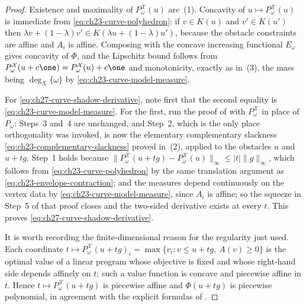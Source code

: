 \begin{proof}
Existence and maximality of \(P^{\mathcal X}_\omega(u)\) are
\,(1).  Concavity of
\(u\mapsto P^{\mathcal X}_\omega(u)\) is immediate from
\eqref{eq:ch23-curve-polyhedron}: if \(v\in K(u)\) and \(v'\in K(u')\) then
\(\lambda v+(1-\lambda)v'\in K(\lambda u+(1-\lambda)u')\), because the
obstacle constraints are affine and \(A_i\) is affine.  Composing with the
concave increasing functional \(E_\omega\) gives concavity of \(\Phi\), and
the Lipschitz bound follows from \(P^{\mathcal X}_\omega(u+c\one)=
P^{\mathcal X}_\omega(u)+c\one\) and monotonicity, exactly as in
\,(3), the mass being
\(\deg_X\{\omega\}\) by \eqref{eq:ch23-curve-model-measure}.

For \eqref{eq:ch27-curve-shadow-derivative}, note first that the second
equality is \eqref{eq:ch23-curve-model-measure}.  For the first, run the
proof of  with
\(P^{\mathcal X}_\omega\) in place of \(P_\omega\): Steps~3 and~4 are
unchanged, and Step~2, which is the only place orthogonality was invoked, is
now the elementary complementary slackness
\eqref{eq:ch23-complementary-slackness} proved in
\,(2), applied to the obstacles
\(u\) and \(u+tg\).  Step~1 holds because
\(\lVert P^{\mathcal X}_\omega(u+tg)-P^{\mathcal X}_\omega(u)\rVert_\infty
\leq|t|\lVert g\rVert_\infty\), which follows from
\eqref{eq:ch23-curve-polyhedron} by the same translation argument as
\eqref{eq:ch23-envelope-contraction}; and the measures depend continuously
on the vertex data by \eqref{eq:ch23-curve-model-measure}, since
\(A_i\) is affine; so the squeeze in Step~5 of that proof closes and the
two-sided derivative exists at every \(t\).  This proves
\eqref{eq:ch27-curve-shadow-derivative}.

It is worth recording the finite-dimensional reason for the regularity just
used.  Each coordinate
\(t\mapsto P^{\mathcal X}_\omega(u+tg)_i
 =\max\{v_i:v\leq u+tg,\ A(v)\geq0\}\)
is the optimal value of a linear program whose objective is fixed and whose
right-hand side depends affinely on \(t\); such a value function is concave
and piecewise affine in \(t\).  Hence \(t\mapsto P^{\mathcal
X}_\omega(u+tg)\) is piecewise affine and \(\Phi(u+tg)\) is piecewise
polynomial, in agreement with the explicit formulas of
.
\end{proof}

